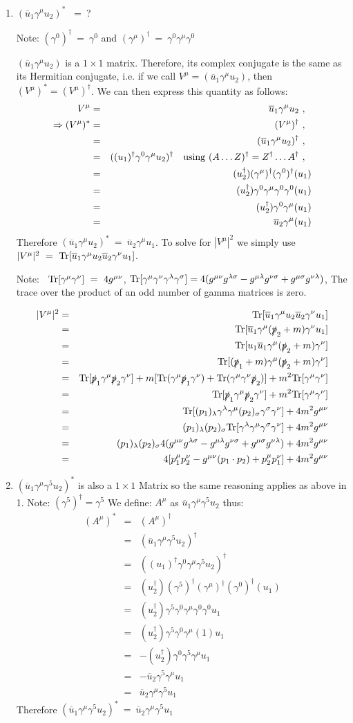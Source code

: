 \documentclass[12pt]{article}
\def \bea{\begin{eqnarray}}
\def \eea{\end{eqnarray}}
\def \Tr{{\rm Tr}}
\def \nn{\nonumber}
\def \nl{\nn \\}
\def \ou{\overline{u}}
\def \ga{\gamma}
\def \la{\lambda}
\def \si{\sigma}
\begin{document}
\begin{enumerate}

\item$(\ou_1\ga^\mu u_2)^*$ ~=~?

Note: $(\ga^0)^\dag~=~\ga^0$ and $(\ga^\mu)^\dag~=~ \ga^0\ga^\mu\ga^0$

$(\ou_1\ga^\mu u_2)$ is a $1\times1$ matrix. Therefore, its complex conjugate is the same as its Hermitian conjugate, i.e. if we call
$V^\mu = (\ou_1\ga^\mu u_2)$, then $(V^\mu)^* = (V^\mu)^\dag$. We can then express this quantity as follows:
\bea
V^\mu &=& \ou_1\ga^\mu u_2 ~,~~ \\
\Rightarrow (V^\mu)^* &=& (V^\mu)^\dag ~,~~ \nl
&=& (\ou_1\ga^\mu u_2)^\dag ~,~~ \nl
&=& ((u_1)^\dag\ga^0\ga^\mu u_2)^\dag ~~~{\rm using}~(A\ldots Z)^\dag = Z^\dag\ldots A^\dag ~,~~ \nl
&=& (u_2^\dag)(\ga^\mu)^\dag(\ga^0)^\dag(u_1)\nl
&=& (u_2^\dag)\ga^0\ga^\mu\ga^0\ga^0(u_1)\nl
&=& (u_2^\dag)\ga^0\ga^\mu(u_1)\nl
&=& \ou_2\ga^\mu(u_1)
\eea
Therefore $(\ou_1\ga^\mu u_2)^*~=~\ou_2\ga^\mu u_1 $. To solve for $|V^\mu|^2$ we simply use $|V^\mu|^2 ~=~ \Tr[\ou_1 \ga^\mu u_2 \ou_2 \ga^\nu u_1]$.

Note: ~$\Tr[\ga^\mu\ga^\nu]~=~4 g^{\mu\nu}$, $\Tr[\ga^\mu \ga^\nu \ga^\la \ga^\si]= 4(g^{\mu\nu}g^{\la\si} - g^{\mu\la} g^{\nu\si} + g^{\mu\si}g^{\nu\la})$, The trace over the product of an odd number of gamma matrices is zero.

\bea
|V^{\mu}|^2 &=& \Tr[\ou_1 \ga^\mu u_2 \ou_2 \ga^\nu u_1] \\
&=& \Tr[\ou_1 \ga^\mu (\slashed{p}_2+m) \ga^\nu u_1]\nl
&=& \Tr[u_1\ou_1 \ga^\mu (\slashed{p}_2+m) \ga^\nu]\nl
&=& \Tr[(\slashed{p}_1+m) \ga^\mu (\slashed{p}_2+m) \ga^\nu]\nl
&=& \Tr[\slashed{p}_1\ga^\mu \slashed{p}_2 \ga^\nu] + m[\Tr(\ga^\mu \slashed{p}_1\ga^\nu) + \Tr(\ga^\mu \ga^\nu \slashed{p}_2)] + m^2\Tr[\ga^\mu \ga^\nu]\nl
&=& \Tr[\slashed{p}_1\ga^\mu \slashed{p}_2 \ga^\nu] + m^2\Tr[\ga^\mu \ga^\nu]\nl
&=& \Tr[(p_1)_\la\ga^\la \ga^\mu (p_2)_\si\ga^\si \ga^\nu  ] + 4m^2g^{\mu\nu}\nl
&=& (p_1)_\la (p_2)_\si \Tr[\ga^\la \ga^\mu\ga^\si \ga^\nu  ] + 4m^2g^{\mu\nu}\nl
&=& (p_1)_\la(p_2)_\si 4(g^{\mu\nu}g^{\la\si} - g^{\mu\la} g^{\nu\si} + g^{\mu\si}g^{\nu\la}) + 4m^2g^{\mu\nu}\nl
&=& 4[p_1^\mu p_2^\nu - g^{\mu\nu}(p_1 \cdot p_2) + p_2^\mu p_1^\nu] + 4m^2g^{\mu\nu} 
\eea

\item $(\ou_1\ga^\mu \ga^5 u_2)^*$ is also a $1\times1$ Matrix so the same reasoning applies as above in 1. Note: $(\ga^5)^\dag = \ga^5$
We define: $A^\mu$ as $\ou_1\ga^\mu\ga^5 u_2$ thus:
\bea
(A^\mu)^* &=& (A^\mu)^\dag \\
&=&(\ou_1\ga^\mu\ga^5 u_2)^\dag \nl
&=& ((u_1)^\dag\ga^0\ga^\mu\ga^5 u_2)^\dag \nl
&=& (u_2^\dag)(\ga^5)^\dag(\ga^\mu)^\dag(\ga^0)^\dag(u_1) \nl
&=& (u_2^\dag)\ga^5\ga^0\ga^\mu\ga^0\ga^0 u_1 \nl
&=& (u_2^\dag)\ga^5\ga^0\ga^\mu(1) u_1 \nl
&=& -(u_2^\dag)\ga^0\ga^5\ga^\mu u_1 \nl
&=& -\ou_2\ga^5\ga^\mu u_1 \nl
&=& \ou_2\ga^\mu\ga^5 u_1
\eea
%
Therefore $(\ou_1\ga^\mu \ga^5 u_2)^*~=~\ou_2 \ga^\mu \ga^5 u_1$


\end{enumerate}
\end{document}
